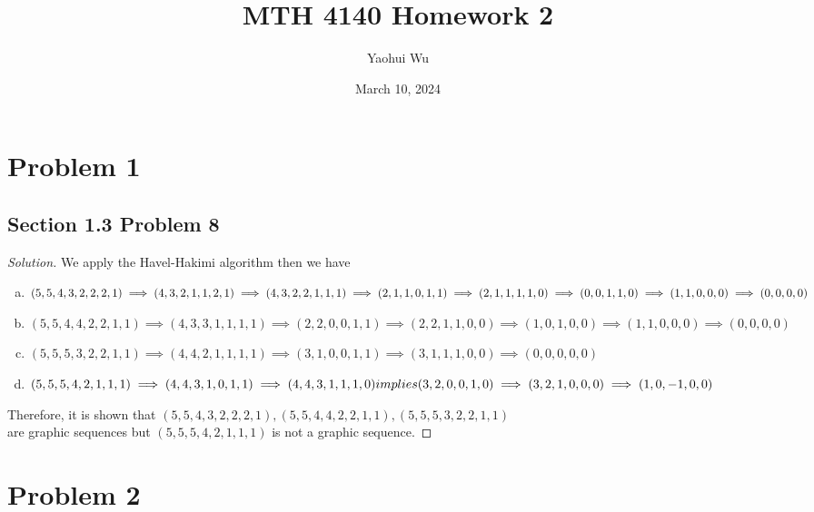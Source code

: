 \documentclass[12pt]{article}
\title{MTH 4140 Homework 2}
\author{Yaohui Wu}
\date{March 10, 2024}
\newenvironment*{solution}{\begin{proof}[Solution]}{\end{proof}}
\begin{document}
\maketitle
\section*{Problem 1}
\subsection*{Section 1.3 Problem 8}
\begin{solution}
    We apply the Havel-Hakimi algorithm then we have
    \begin{enumerate}[(a)]
        \item \((5,5,4,3,2,2,2,1)\implies(4,3,2,1,1,2,1)\implies(4,3,2,2,1,1,1
        )\implies(2,1,1,0,1,1) \\ \implies(2,1,1,1,1,0)\implies(0,0,1,1,0)
        \implies(1,1,0,0,0)\implies(0,0,0,0)\)
        \item \((5,5,4,4,2,2,1,1)\implies(4,3,3,1,1,1,1)\implies(2,2,0,0,1,1)
        \implies(2,2,1,1,0,0)\implies(1,0,1,0,0)\implies(1,1,0,0,0)\implies(0,
        0,0,0)\)
        \item \((5,5,5,3,2,2,1,1)\implies(4,4,2,1,1,1,1)\implies(3,1,0,0,1,1)
        \implies(3,1,1,1,0,0)\implies(0,0,0,0,0)\)
        \item \((5,5,5,4,2,1,1,1)\implies(4,4,3,1,0,1,1)\implies(4,4,3,1,1,1,0
        )\ \\ implies(3,2,0,0,1,0)\implies(3,2,1,0,0,0)\implies(1,0,-1,0,0)\)
    \end{enumerate}
    Therefore, it is shown that \((5,5,4,3,2,2,2,1),(5,5,4,4,2,2,1,1),(5,5,5,3
    ,2,2,1,1)\) \\ are graphic sequences but \((5,5,5,4,2,1,1,1)\)  is not a
    graphic sequence.
\end{solution}
\section*{Problem 2}
\end{document}

